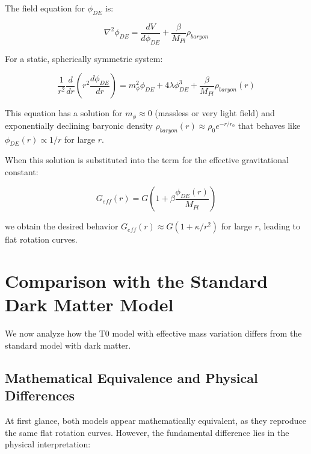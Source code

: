 \documentclass[a4paper,12pt]{article}
\begin{document}
The field equation for $\phi_{DE}$ is:

\begin{equation}
	\nabla^2 \phi_{DE} = \frac{dV}{d\phi_{DE}} + \frac{\beta}{M_{Pl}}\rho_{baryon}
\end{equation}

For a static, spherically symmetric system:

\begin{equation}
	\frac{1}{r^2}\frac{d}{dr}\left(r^2\frac{d\phi_{DE}}{dr}\right) = m_{\phi}^2\phi_{DE} + 4\lambda\phi_{DE}^3 + \frac{\beta}{M_{Pl}}\rho_{baryon}(r)
\end{equation}

This equation has a solution for $m_{\phi} \approx 0$ (massless or very light field) and exponentially declining baryonic density $\rho_{baryon}(r) \approx \rho_0 e^{-r/r_0}$ that behaves like $\phi_{DE}(r) \propto 1/r$ for large $r$.

When this solution is substituted into the term for the effective gravitational constant:

\begin{equation}
	G_{eff}(r) = G\left(1 + \beta\frac{\phi_{DE}(r)}{M_{Pl}}\right)
\end{equation}

we obtain the desired behavior $G_{eff}(r) \approx G(1 + \kappa/r^2)$ for large $r$, leading to flat rotation curves.

\section{Comparison with the Standard Dark Matter Model}

We now analyze how the T0 model with effective mass variation differs from the standard model with dark matter.

\subsection{Mathematical Equivalence and Physical Differences}

At first glance, both models appear mathematically equivalent, as they reproduce the same flat rotation curves. However, the fundamental difference lies in the physical interpretation:
\end{document}
